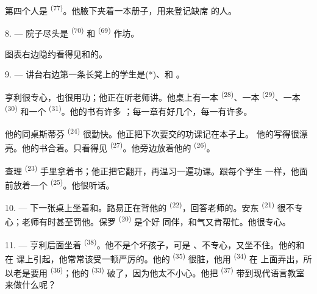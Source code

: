 第四个人是 \textsuperscript{(77)}。他腋下夹着一本册子，用来登记缺席
的人。

8. --- 院子尽头是 \textsuperscript{(70)} 和
\textsuperscript{(69)} 作坊。

图表右边隐约看得见和的。


\VUsaut{2.4mm}

\VUsaut{3.0mm}

9. --- 讲台右边第一条长凳上的学生是(*)、和
。

亨利很专心，也很用功；他正在听老师讲。他桌上有一本
\textsuperscript{(28)}、一本 \textsuperscript{(29)}、一本
\textsuperscript{(30)} 和一个 \textsuperscript{(31)}。他的书有许多
；每一章有好几个，每一有许多。

他的同桌斯蒂芬 \textsuperscript{(24)} 很勤快。他正把下次要交的功课记在本子上。
他的写得很漂亮。他的书合着。只看得见
\textsuperscript{(27)}。他旁边放着他的 \textsuperscript{(26)}。

查理 \textsuperscript{(23)} 手里拿着书；他正把它翻开，再温习一遍功课。跟每个学生
一样，他面前放着一个 \textsuperscript{(25)}。他很听话。

10. --- 下一张桌上坐着和。路易正在背他的
 \textsuperscript{(22)}，回答老师的。安东
\textsuperscript{(21)} 很不专心；老师有时甚至罚他。保罗 \textsuperscript{(20)} 是个好
同伴，和气又肯帮忙。他很专心。

\VUsaut{4.2mm}
\VUsaut{3.2mm}

11. --- 亨利后面坐着 \textsuperscript{(38)}。他不是个坏孩子，可是
、不专心，又坐不住。他的和在
课上引起，他常常该受一顿严厉的。他的
 \textsuperscript{(35)} 很脏，他用 \textsuperscript{(34)} 在
上面弄出，所以老是要用 \textsuperscript{(36)}；他的
 \textsuperscript{(33)} 破了，因为他太不小心。他把
\textsuperscript{(37)} 带到现代语言教室来做什么呢？

